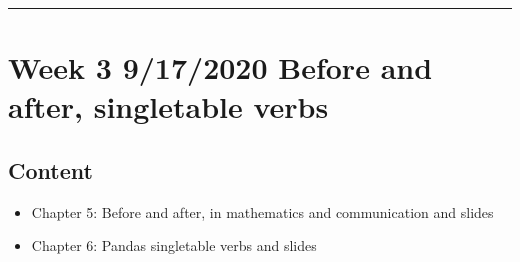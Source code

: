 \documentclass[letterpaper,10pt,english]{sphinxmanual}
\begin{document}
\bigskip\hrule\bigskip



\section{Week 3 \sphinxhyphen{} 9/17/2020 \sphinxhyphen{} Before and after, single\sphinxhyphen{}table verbs}
\label{\detokenize{course-schedule:week-3-9-17-2020-before-and-after-single-table-verbs}}

\subsection{Content}
\label{\detokenize{course-schedule:id3}}\begin{itemize}
\item {} 
Chapter 5: Before and after, in mathematics and communication \sphinxhyphen{} {\hyperref[\detokenize{chapter-5-before-and-after::doc}]{}} and slides

\item {} 
Chapter 6: Pandas single\sphinxhyphen{}table verbs \sphinxhyphen{} {\hyperref[\detokenize{chapter-6-single-table-verbs::doc}]{}} and slides

\end{itemize}
\end{document}
